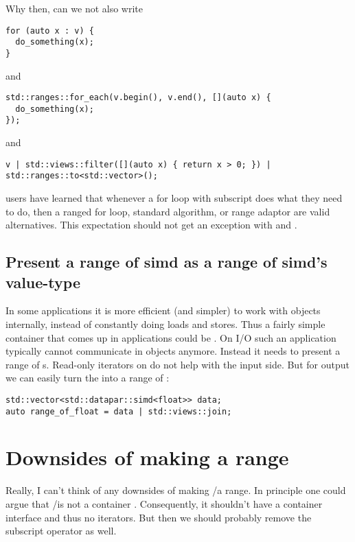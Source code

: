 Why then, can we not also write
\medskip\begin{lstlisting}
for (auto x : v) {
  do_something(x);
}
\end{lstlisting}
and
\medskip\begin{lstlisting}
std::ranges::for_each(v.begin(), v.end(), [](auto x) {
  do_something(x);
});
\end{lstlisting}
and
\medskip\begin{lstlisting}
v | std::views::filter([](auto x) { return x > 0; }) | std::ranges::to<std::vector>();
\end{lstlisting}

\CC{} users have learned that whenever a for loop with subscript does what they need to do, then a
ranged for loop, standard algorithm, or range adaptor are valid alternatives.
This expectation should not get an exception with \simd and \mask.

\subsection{Present a range of simd as a range of simd's value-type}

In some applications it is more efficient (and simpler) to work with \simd objects internally,
instead of constantly doing loads and stores.
Thus a fairly simple container that comes up in applications could be
.
On I/O such an application typically cannot communicate in \simd objects anymore.
Instead it needs to present a range of s.
Read-only iterators on \simd do not help with the input side.
But for output we can easily turn the  into a range of :
\medskip\begin{lstlisting}
std::vector<std::datapar::simd<float>> data;
auto range_of_float = data | std::views::join;
\end{lstlisting}

\section{Downsides of making  a range}

Really, I can't think of any downsides of making \simd/\mask a range.
In principle one could argue that \simd/\mask is not a container \cite{P0851R0}.
Consequently, it shouldn't have a container interface and thus no iterators.
But then we should probably remove the subscript operator as well.

